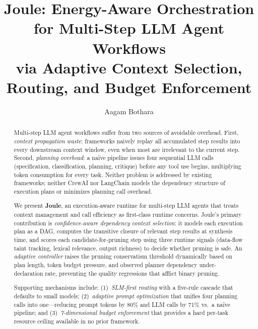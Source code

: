 \documentclass[sigconf,authordraft]{acmart}
\begin{document}
\title{Joule: Energy-Aware Orchestration for Multi-Step LLM Agent Workflows\\
via Adaptive Context Selection, Routing, and Budget Enforcement}

\author{Aagam Bothara}

\renewcommand{\shortauthors}{Bothara}

\begin{abstract}
Multi-step LLM agent workflows suffer from two sources of avoidable overhead.
First, \emph{context propagation waste}: frameworks naively replay all accumulated step results into every downstream context window, even when most are irrelevant to the current step.
Second, \emph{planning overhead}: a na\"{i}ve pipeline issues four sequential LLM calls (specification, classification, planning, critique) before any tool use begins, multiplying token consumption for every task.
Neither problem is addressed by existing frameworks; neither CrewAI nor LangChain models the dependency structure of execution plans or minimizes planning call overhead.

We present \textbf{Joule}, an execution-aware runtime for multi-step LLM agents that treats context management and call efficiency as first-class runtime concerns.
Joule's primary contribution is \emph{confidence-aware dependency context selection}: it models each execution plan as a DAG, computes the transitive closure of relevant step results at synthesis time, and scores each candidate-for-pruning step using three runtime signals (data-flow taint tracking, lexical relevance, output richness) to decide whether pruning is safe.
An \emph{adaptive controller} raises the pruning conservatism threshold dynamically based on plan length, token budget pressure, and observed planner dependency under-declaration rate, preventing the quality regressions that afflict binary pruning.

Supporting mechanisms include: (1)~\emph{SLM-first routing} with a five-rule cascade that defaults to small models; (2)~\emph{adaptive prompt optimization} that unifies four planning calls into one---reducing prompt tokens by 80\% and LLM calls by 71\% vs.\ a na\"{i}ve pipeline; and (3)~\emph{7-dimensional budget enforcement} that provides a hard per-task resource ceiling available in no prior framework.


\end{abstract}
\end{document}
